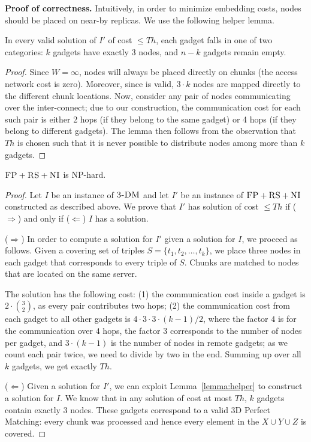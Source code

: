 \documentclass[9pt]{sigcomm-alternate}
\newcommand{\CC}{\textsc{NI}}
\newcommand{\FP}{\textsc{FP}}
\newcommand{\RS}{\textsc{RS}}
\newcommand{\TDM}{\textsc{3-DM}}
\newcommand{\Thr}{\ensuremath{Th}}
\begin{document}
\textbf{Proof of correctness.}
Intuitively, in order to minimize embedding costs,
nodes should be placed on near-by replicas. We use the following
helper lemma.
\begin{lemma}\label{lemma:helper}
In every valid solution of $I'$ of cost $\leq \Thr$, each gadget
falls in one of two categories:
$k$ gadgets have exactly
$3$ nodes, and $n-k$ gadgets remain empty.
\end{lemma}
\begin{proof}
Since $W=\infty$, nodes will always be placed
directly on chunks (the access network cost is zero).
Moreover, since
is valid, $3 \cdot k$ nodes are mapped
directly to the different chunk locations.
Now, consider any pair of nodes communicating over the
inter-connect; due to our construction, the communication cost
for each such pair is either
2 hops (if they belong to the same gadget) or 4 hops (if they belong
to different gadgets).
The lemma then follows from the observation that $\Thr$
is chosen such that it is never possible to distribute nodes
among more than $k$ gadgets.
\end{proof}

\begin{theorem}
$\FP+\RS+\CC$ is NP-hard.
\end{theorem}
\begin{proof}
Let $I$ be an instance of $\TDM$ and let $I'$ be an instance of
$\FP+\RS+\CC$ constructed as described above.
We prove that $I'$ has solution of cost $\leq \Thr$ if ($\Rightarrow$) and only if
($\Leftarrow$)
$I$ has a solution.

($\Rightarrow$) In order to compute a solution
for $I'$ given a solution for $I$, we proceed as follows.
Given a covering set of triples $S = \{t_1, t_2, \ldots, t_k\}$, we place three nodes in each gadget that
corresponds to every triple of $S$. Chunks are matched to nodes that are located
on the same server.

The solution has the following cost:
(1) the communication cost inside a gadget is $2 \cdot {3 \choose 2}$,
  as every pair contributes two hops;
  (2) the communication cost from each gadget to all other gadgets is $4
  \cdot 3 \cdot 3 \cdot (k - 1) / 2$, where the factor $4$ is
  for the
  communication over $4$ hops, the factor $3$
  corresponds to the number of nodes per gadget, and
  $3 \cdot (k-1)$ is the number of nodes in remote gadgets;
  as we count each pair twice, we need to divide by two in the end.
Summing up over all $k$ gadgets, we get exactly $\Thr$.

($\Leftarrow$) Given a solution for $I'$,
we can exploit Lemma~\ref{lemma:helper} to construct a solution for $I$.
We know that in any solution of cost at most $\Thr$,
$k$ gadgets contain exactly 3 nodes. These gadgets correspond to a valid
3D Perfect Matching: every
chunk was processed and hence every element in the $X \cup Y \cup Z$ is covered.
\end{proof}
\end{document}
